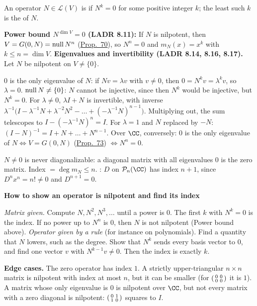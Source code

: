 \documentclass[10pt]{scrartcl}
\newcommand{\LL}{\mathcal L}\newcommand{\PP}{\mathcal P}\newcommand{\MM}{\mathcal M}
\newenvironment{methodbox}[1]{\begin{mdframed}[style=mdbluebox,linecolor=NavyBlue,backgroundcolor=NavyBlue!3]\textbf{\color{NavyBlue}#1}\par\vspace{2pt}}{\end{mdframed}}
\begin{document}
\begin{definition*}\hypertarget{def-39}{}\label{def-39}
  An operator $N\in\LL(V)$ is  if $N^k=0$ for some positive integer $k$; the least such $k$ is the  of $N$.
\end{definition*}
\begin{itemize}
  \ii \textbf{Power bound $N^{\dim V}=0$ (LADR 8.11):} If $N$ is nilpotent, then $V=G(0,N)=\operatorname{null} N^n$ (\hyperref[prop-70]{Prop.~70}), so $N^n=0$ and $m_N(x)=x^k$ with $k\le n=\dim V$.
  \ii \textbf{Eigenvalues and invertibility (LADR 8.14, 8.16, 8.17).} Let $N$ be nilpotent on $V\ne\{0\}$.
  \begin{itemize}
    \ii $0$ is the only eigenvalue of $N$: if $Nv=\lambda v$ with $v\ne0$, then $0=N^kv=\lambda^kv$, so $\lambda=0$.
    \ii $\operatorname{null} N\ne\{0\}$: $N$ cannot be injective, since then $N^k$ would be injective, but $N^k=0$.
    \ii For $\lambda\ne0$, $\lambda I+N$ is invertible, with inverse $\lambda^{-1}\bigl(I-\lambda^{-1}N+\lambda^{-2}N^2-\dots+(-\lambda^{-1}N)^{n-1}\bigr)$. Multiplying out, the sum telescopes to $I-(-\lambda^{-1}N)^n=I$. For $\lambda=1$ and $N$ replaced by $-N$: $(I-N)^{-1}=I+N+\dots+N^{n-1}$.
    \ii Over $\CC$, conversely: $0$ is the only eigenvalue of $N\iff V=G(0,N)$ (\hyperref[prop-73]{Prop.~73}) $\iff N^n=0$.
  \end{itemize}
  \ii $N\ne0$ is never diagonalizable: a diagonal matrix with all eigenvalues $0$ is the zero matrix.
  \ii Index $=\deg m_N\le n$. : $D$ on $\PP_n(\CC)$ has index $n+1$, since $D^nx^n=n!\ne0$ and $D^{n+1}=0$.
\end{itemize}

\begin{methodbox}{How to show an operator is nilpotent and find its index}
\begin{enumerate}[label=\arabic*.,leftmargin=1.5em,itemsep=2pt,topsep=2pt]
  \ii \emph{Matrix given.} Compute $N,N^2,N^3,\dots$ until a power is $0$. The first $k$ with $N^k=0$ is the index. If no power up to $N^n$ is $0$, then $N$ is not nilpotent (Power bound above).
  \ii \emph{Operator given by a rule} (for instance on polynomials). Find a quantity that $N$ lowers, such as the degree. Show that $N^k$ sends every basis vector to $0$, and find one vector $v$ with $N^{k-1}v\ne0$. Then the index is exactly $k$.
\end{enumerate}
\textbf{Edge cases.} The zero operator has index $1$. A strictly upper-triangular $n\times n$ matrix is nilpotent with index at most $n$, but it can be smaller (for $\begin{psmallmatrix}0&0\\0&0\end{psmallmatrix}$ it is $1$). A matrix whose only eigenvalue is $0$ is nilpotent over $\CC$, but not every matrix with a zero diagonal is nilpotent: $\begin{psmallmatrix}0&1\\1&0\end{psmallmatrix}$ squares to $I$.
\end{methodbox}
\end{document}
